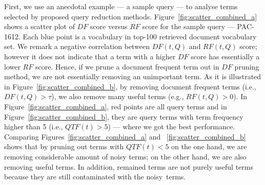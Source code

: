First, we use an anecdotal example --- a sample query --- to analyse terms selected by proposed query reduction methods. 
Figure~\ref{fig:scatter_combined_a} shows a scatter plot of $\mathit{DF}$ score versus $\mathit{RF}$ score for the sample query --- PAC-1612. Each blue point is a vocabulary in top-100 retrieved document vocabulary set. We remark a negative correlation between $\mathit{DF(t, Q)}$ and $\mathit{RF(t, Q)}$ score; however it does not indicate that a term with a higher $\mathit{DF}$ score has essentially a lower $\mathit{RF}$ score.
Hence, if we prune a document frequent term out in $\mathit{DF}$ pruning method, we are not essentially removing an unimportant term.
As it is illustrated in Figure~\ref{fig:scatter_combined_b}, by removing document frequent terms (i.e., $DF(t, Q)>\tau$), we also remove many useful terms (e.g., $RF(t, Q)>0$). In Figure~\ref{fig:scatter_combined_a}, red points are all query terms and in Figure~\ref{fig:scatter_combined_b}, they are query terms with term frequency higher than 5 (i.e., $QTF(t)>5$) --- where we got the best performance. 
Comparing Figures~\ref{fig:scatter_combined_a} and ~\ref{fig:scatter_combined_b} shows that by pruning out  terms with $QTF(t)<5$ on the one hand, we are removing considerable amount of noisy terms; on the other hand, we are also removing useful terms. In addition, remained terms are not purely useful terms because they are still contaminated with the noisy~terms. %
